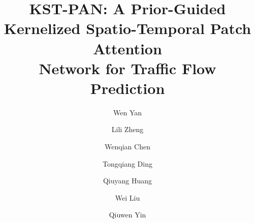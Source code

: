 \documentclass[5p,times,authoryear]{elsarticle}
\begin{document}


\begin{frontmatter}




\title{KST-PAN: A Prior-Guided Kernelized Spatio-Temporal Patch Attention \\ Network for Traffic Flow Prediction}


\author[First]{Wen Yan}

\author[First]{Lili Zheng}

\author[Second]{Wenqian Chen}

\author[First]{Tongqiang Ding }

\author[First]{Qiuyang Huang}

\author[Third]{Wei Liu}
\author[Third]{Qiuwen Yin}


\end{frontmatter}
\end{document}
